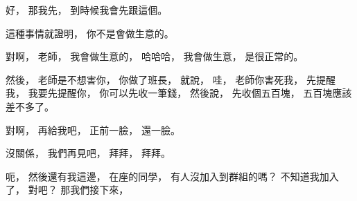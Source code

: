 \hypertarget{w02:cue:2931}{}好，
\hypertarget{w02:cue:2932}{}那我先，
\hypertarget{w02:cue:2933}{}到時候我會先跟這個。

\hypertarget{w02:cue:2934}{}這種事情就證明，
\hypertarget{w02:cue:2935}{}你不是會做生意的。

\hypertarget{w02:cue:2936}{}對啊，
\hypertarget{w02:cue:2937}{}老師，
\hypertarget{w02:cue:2938}{}我會做生意的，
\hypertarget{w02:cue:2939}{}哈哈哈，
\hypertarget{w02:cue:2940}{}我會做生意，
\hypertarget{w02:cue:2941}{}是很正常的。

\hypertarget{w02:cue:2942}{}然後，
\hypertarget{w02:cue:2943}{}老師是不想害你，
\hypertarget{w02:cue:2944}{}你做了班長，
\hypertarget{w02:cue:2945}{}就說，
\hypertarget{w02:cue:2946}{}哇，
\hypertarget{w02:cue:2947}{}老師你害死我，
\hypertarget{w02:cue:2948}{}先提醒我，
\hypertarget{w02:cue:2949}{}我要先提醒你，
\hypertarget{w02:cue:2950}{}你可以先收一筆錢，
\hypertarget{w02:cue:2951}{}然後說，
\hypertarget{w02:cue:2952}{}先收個五百塊，
\hypertarget{w02:cue:2953}{}五百塊應該差不多了。

\hypertarget{w02:cue:2954}{}對啊，
\hypertarget{w02:cue:2955}{}再給我吧，
\hypertarget{w02:cue:2956}{}正前一臉，
\hypertarget{w02:cue:2957}{}還一臉。

\hypertarget{w02:cue:2958}{}沒關係，
\hypertarget{w02:cue:2959}{}我們再見吧，
\hypertarget{w02:cue:2960}{}拜拜，
\hypertarget{w02:cue:2961}{}拜拜。

\hypertarget{w02:cue:2962}{}呃，
\hypertarget{w02:cue:2963}{}然後還有我這邊，
\hypertarget{w02:cue:2964}{}在座的同學，
\hypertarget{w02:cue:2965}{}有人沒加入到群組的嗎？
\hypertarget{w02:cue:2966}{}不知道我加入了，
\hypertarget{w02:cue:2967}{}對吧？
\hypertarget{w02:cue:2968}{}那我們接下來，
